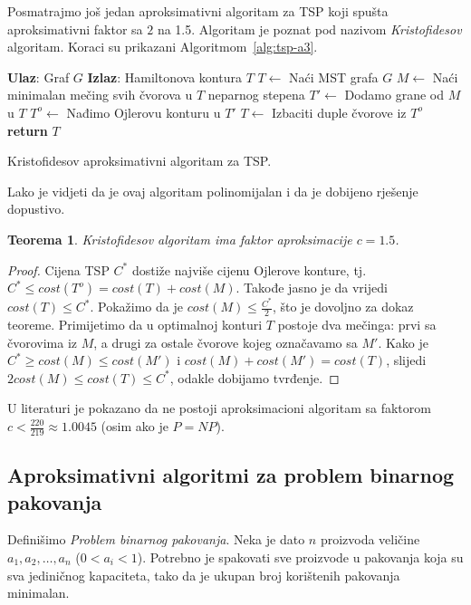 \documentclass[a4paper, utf8, 11pt, colorlinks]{book}
\newtheorem{thm}{Teorema}[chapter]
\theoremstyle{definition}
\begin{document}
Posmatrajmo još jedan aproksimativni algoritam za TSP koji spušta aproksimativni faktor sa $2$ na 1.5. Algoritam je poznat pod nazivom \emph{Kristofidesov} algoritam.
Koraci su prikazani Algoritmom~\ref{alg:tsp-a3}.

\begin{algorithm}[H] 

	\begin{algorithmic}[1]
		\STATE \textbf{Ulaz}: Graf $G$
		\STATE \textbf{Izlaz}: Hamiltonova kontura $T$ 
		\STATE $T \gets$ Naći MST grafa $G$
		\STATE $M \gets$ Naći minimalan mečing svih čvorova u $T$ neparnog stepena
		\STATE $T' \gets$ Dodamo grane od $M$ u $T$
		\STATE $T^o\gets$ Nađimo Ojlerovu konturu u $T'$
		\STATE $T \gets$ Izbaciti duple čvorove iz $T^o$
		\STATE \textbf{return} $T$
	\end{algorithmic}	
    \caption{Kristofidesov aproksimativni algoritam za TSP.}
    \label{alg:tsp-a3}
\end{algorithm}
  Lako je vidjeti da je ovaj algoritam polinomijalan i da je dobijeno rješenje dopustivo. 
  \begin{thm}
  	  Kristofidesov algoritam ima faktor aproksimacije $c=1.5$.
  \end{thm}
\begin{proof}
  Cijena TSP $C^*$ dostiže najviše cijenu Ojlerove konture, tj.  $C^*\leq cost(T^o) = cost(T) + cost(M)$.  Takođe jasno je da vrijedi $cost(T) \leq C^*$. Pokažimo da je $cost(M) \leq  \frac{C^*}{2}$, što je dovoljno za dokaz teoreme. Primijetimo da u optimalnoj konturi $T$ postoje dva mečinga: prvi sa čvorovima iz $M$, a drugi za ostale čvorove kojeg označavamo sa $M'$. 
  Kako je $C^* \geq cost(M) \leq cost(M')$ i $cost(M) + cost(M') = cost(T)$, slijedi 
  $2 cost(M) \leq cost(T) \leq C^*$, odakle dobijamo tvrđenje.  
\end{proof} 

U literaturi je pokazano da ne postoji  aproksimacioni algoritam sa faktorom  $c < \frac{220}{219} \approx 1.0045$ (osim ako je $P=NP$). 
 
 
 \subsection{Aproksimativni algoritmi za problem binarnog pakovanja}\label{sec:binpack}

Definišimo \emph{Problem binarnog pakovanja}.  Neka je dato $n$ proizvoda veličine $a_1,a_2,\ldots,a_n$ ($0<a_i<1$). Potrebno je spakovati sve proizvode u pakovanja koja su sva jediničnog kapaciteta, tako da je ukupan broj korištenih pakovanja minimalan.  
\end{document}
